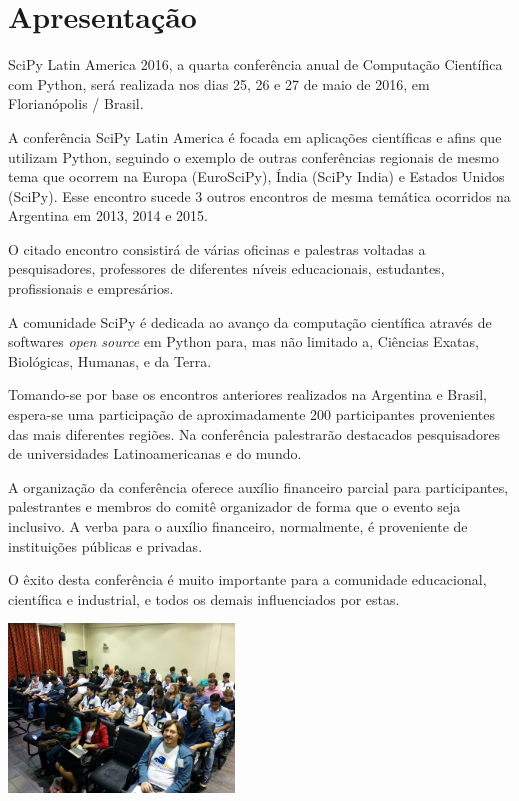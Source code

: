 \documentclass[a4paper,twocolumn,openright,article,12pt]{memoir}
\begin{document}
\clearpage

\restoregeometry
\pagestyle{plain} %
\setcounter{page}{2}
\tableofcontents*

\chapter*{Apresentação}

SciPy Latin America 2016, a quarta conferência anual de Computação Científica com Python, será realizada nos dias 25, 26 e 27 de maio de 2016, em Florianópolis / Brasil.

A conferência SciPy Latin America é focada em aplicações científicas e afins que
utilizam Python, seguindo o exemplo de outras conferências regionais de mesmo tema que ocorrem na Europa (EuroSciPy), Índia (SciPy India) e Estados Unidos (SciPy). Esse encontro sucede 3 outros encontros de mesma temática ocorridos na Argentina em 2013, 2014 e 2015.

O citado encontro consistirá de várias oficinas e palestras voltadas a pesquisadores, professores de diferentes níveis educacionais, estudantes, profissionais e empresários.

A comunidade SciPy é dedicada ao avanço da computação científica através de softwares \emph{open source} em Python para, mas não limitado a, Ciências Exatas, Biológicas, Humanas, e da Terra.

Tomando-se por base os encontros anteriores realizados na Argentina e Brasil, espera-se uma participação de aproximadamente 200 participantes provenientes das mais diferentes regiões. Na conferência palestrarão destacados pesquisadores de universidades Latinoamericanas e do mundo.

A organização da conferência oferece auxílio financeiro parcial para participantes,
palestrantes e membros do comitê organizador de forma que o evento seja inclusivo.
A verba para o auxílio financeiro, normalmente, é proveniente
de instituições públicas e privadas.

O êxito desta conferência é muito importante para a comunidade educacional, científica e industrial, e todos os demais influenciados por estas.

\ifprint
\else
	\begin{center}
          \includegraphics[width=6cm]{../img/IMG_20150521_102157-small.jpg}
	\end{center}
\fi
\end{document}
